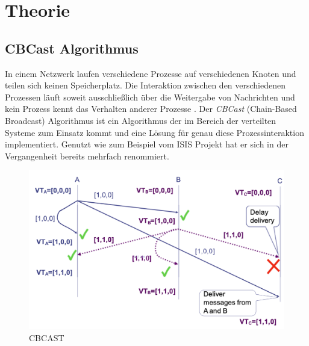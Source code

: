 \section{Theorie}

\subsection{CBCast Algorithmus}

In einem Netzwerk laufen verschiedene Prozesse auf verschiedenen Knoten und teilen sich keinen Speicherplatz. Die Interaktion zwischen den verschiedenen Prozessen läuft soweit ausschließlich über die Weitergabe von Nachrichten und kein Prozess kennt das Verhalten anderer Prozesse \cite{CBCAST_1}. Der \textit{CBCast} (Chain-Based Broadcast) Algorithmus ist ein Algorithmus der im Bereich der verteilten Systeme zum Einsatz kommt und eine Lösung für genau diese Prozessinteraktion implementiert. Genutzt wie zum Beispiel vom ISIS Projekt \cite{isis_project} hat er sich in der Vergangenheit bereits mehrfach renommiert. 

\begin{figure}[htbp]
\begin{center}
\includegraphics[scale=0.4]{Latex/Bilder/cbcast_1.png}
\caption{\label{fig:cbcastFunction} CBCAST \cite{Aufgabenstellung}} 
\end{center}
\end{figure}

